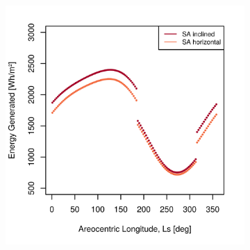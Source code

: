 \begin{figure}[h]
\captionsetup[subfigure]{justification=centering}
\vspace{-2ex}
	\centering
    \setlength{\subfigureWidth}{0.50\textwidth}
    \setlength{\graphicsHeight}{80mm}
    \hypersetup{hidelinks=true}%
    \begin{subfigure}[t]{\subfigureWidth}
        \centering
        \includegraphics[height=\graphicsHeight]{sections/design/solar-array/plots/ismeniuscavus-daily-generated-energy-for-solar-cell-coverage-area-41m2.png}
        \label{fig:plot:sub:ismenius-cavus-generated-energy}
    \end{subfigure}\hfill
    \begin{subfigure}[t]{\subfigureWidth}
        \centering

\end{subfigure}
\end{figure}
